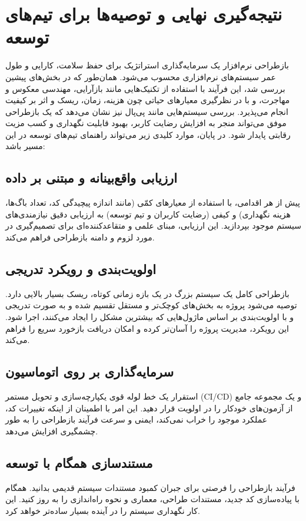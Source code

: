\section{نتیجه‌گیری نهایی و توصیه‌ها برای تیم‌های توسعه}
\label{section:8}

بازطراحی نرم‌افزار یک سرمایه‌گذاری استراتژیک برای حفظ سلامت، کارایی و طول عمر سیستم‌های نرم‌افزاری محسوب می‌شود. همان‌طور که در بخش‌های پیشین بررسی شد، این فرآیند با استفاده از تکنیک‌هایی مانند بازآرایی، مهندسی معکوس و مهاجرت، و با در نظرگیری معیارهای حیاتی چون هزینه، زمان، ریسک و اثر بر کیفیت انجام می‌پذیرد. بررسی سیستم‌هایی مانند پی‌پال نیز نشان می‌دهد که یک بازطراحی موفق می‌تواند منجر به افزایش رضایت کاربر، بهبود قابلیت نگهداری و کسب مزیت رقابتی پایدار شود. در پایان، موارد کلیدی زیر می‌تواند راهنمای تیم‌های توسعه در این مسیر باشد:

\subsection{ارزیابی واقع‌بینانه و مبتنی بر داده}
پیش از هر اقدامی، با استفاده از معیارهای کمّی (مانند اندازه پیچیدگی کد، تعداد باگ‌ها، هزینه نگهداری) و کیفی (رضایت کاربران و تیم توسعه) به ارزیابی دقیق نیازمندی‌های سیستم موجود بپردازید. این ارزیابی، مبنای علمی و متقاعدکننده‌ای برای تصمیم‌گیری در مورد لزوم و دامنه بازطراحی فراهم می‌کند.

\subsection{اولویت‌بندی و رویکرد تدریجی}
بازطراحی کامل یک سیستم بزرگ در یک بازه زمانی کوتاه، ریسک بسیار بالایی دارد. توصیه می‌شود پروژه به بخش‌های کوچک‌تر و مستقل تقسیم شده و به صورت تدریجی و با اولویت‌بندی بر اساس ماژول‌هایی که بیشترین مشکل را ایجاد می‌کنند، اجرا شود. این رویکرد، مدیریت پروژه را آسان‌تر کرده و امکان دریافت بازخورد سریع را فراهم می‌کند.

\subsection{سرمایه‌گذاری بر روی اتوماسیون}
استقرار یک خط لوله قوی یکپارچه‌سازی و تحویل مستمر (CI/CD) و یک مجموعه جامع از آزمون‌های خودکار را در اولویت قرار دهید. این امر با اطمینان از اینکه تغییرات کد، عملکرد موجود را خراب نمی‌کند، ایمنی و سرعت فرآیند بازطراحی را به طور چشمگیری افزایش می‌دهد.

\subsection{مستندسازی همگام با توسعه}
فرآیند بازطراحی را فرصتی برای جبران کمبود مستندات سیستم قدیمی بدانید. همگام با پیاده‌سازی کد جدید، مستندات طراحی، معماری و نحوه راه‌اندازی را به روز کنید. این کار نگهداری سیستم را در آینده بسیار ساده‌تر خواهد کرد.

